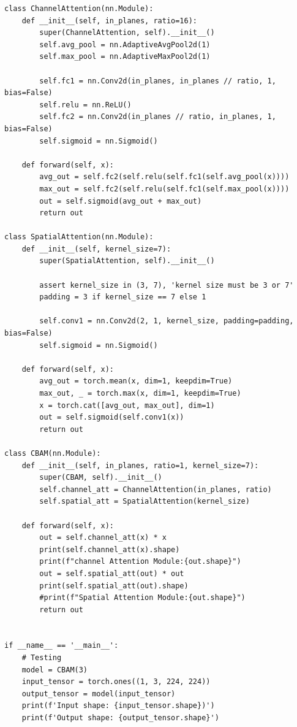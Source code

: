 \documentclass[12pt]{ctexart}
\begin{document}
\lstset{language=python} %
\begin{lstlisting}
class ChannelAttention(nn.Module):
    def __init__(self, in_planes, ratio=16):
        super(ChannelAttention, self).__init__()
        self.avg_pool = nn.AdaptiveAvgPool2d(1)
        self.max_pool = nn.AdaptiveMaxPool2d(1)

        self.fc1 = nn.Conv2d(in_planes, in_planes // ratio, 1, bias=False)
        self.relu = nn.ReLU()
        self.fc2 = nn.Conv2d(in_planes // ratio, in_planes, 1, bias=False)
        self.sigmoid = nn.Sigmoid()

    def forward(self, x):
        avg_out = self.fc2(self.relu(self.fc1(self.avg_pool(x))))
        max_out = self.fc2(self.relu(self.fc1(self.max_pool(x))))
        out = self.sigmoid(avg_out + max_out)
        return out

class SpatialAttention(nn.Module):
    def __init__(self, kernel_size=7):
        super(SpatialAttention, self).__init__()

        assert kernel_size in (3, 7), 'kernel size must be 3 or 7'
        padding = 3 if kernel_size == 7 else 1

        self.conv1 = nn.Conv2d(2, 1, kernel_size, padding=padding, bias=False)
        self.sigmoid = nn.Sigmoid()

    def forward(self, x):
        avg_out = torch.mean(x, dim=1, keepdim=True)
        max_out, _ = torch.max(x, dim=1, keepdim=True)
        x = torch.cat([avg_out, max_out], dim=1)
        out = self.sigmoid(self.conv1(x))
        return out

class CBAM(nn.Module):
    def __init__(self, in_planes, ratio=1, kernel_size=7):
        super(CBAM, self).__init__()
        self.channel_att = ChannelAttention(in_planes, ratio)
        self.spatial_att = SpatialAttention(kernel_size)

    def forward(self, x):
        out = self.channel_att(x) * x
        print(self.channel_att(x).shape)
        print(f"channel Attention Module:{out.shape}")
        out = self.spatial_att(out) * out
        print(self.spatial_att(out).shape)
        #print(f"Spatial Attention Module:{out.shape}")
        return out


if __name__ == '__main__':
    # Testing
    model = CBAM(3)
    input_tensor = torch.ones((1, 3, 224, 224))
    output_tensor = model(input_tensor)
    print(f'Input shape: {input_tensor.shape})')
    print(f'Output shape: {output_tensor.shape}')
\end{lstlisting}
\end{document}
